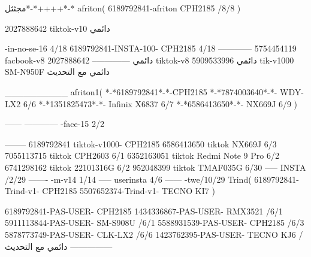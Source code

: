 مجثثل*-*++++*-*
afriton(
6189792841-afriton CPH2185  /8/8
)

2027888642 tiktok-v10
دائمي

-in-no-se-16 4/18
6189792841-INSTA-100- CPH2185 4/18
------------
5754454119 facbook-v8
دائمي
--------------
2027888642 tiktok-v8
دائمي
5909533996 tik-v1000  SM-N950F
دائمي مع التحديث

__________
afriton1(
*-*6189792841*-*-CPH2185
*-*7874003640*-*- WDY-LX2  6/6
*-*1351825473*-*- Infinix X6837  6/7
*-*6586413650*-*- NX669J  6/9
)


------
------------
-face-15 2/2

--------
6189792841 tiktok-v1000- CPH2185 
6586413650 tiktok NX669J  6/3
7055113715 tiktok  CPH2603   6/1
6352163051 tiktok  Redmi Note 9 Pro   6/2
6741298162 tiktok 22101316G  6/2
952048399 tiktok TMAF035G  6/30
-----
 INSTA /2/29
-------
-m-v14 1/14
-----
userinsta 4/6
------
-twe/10/29
Trind(
6189792841-Trind-v1- CPH2185 
5507652374-Trind-v1- TECNO KI7 \6\7
)


6189792841-PAS-USER- CPH2185 
1434336867-PAS-USER-  RMX3521  /6/1
5911113844-PAS-USER-  SM-S908U  /6/1
5588931539-PAS-USER- CPH2185  /6/3
5878773749-PAS-USER- CLK-LX2  /6/6
1423762395-PAS-USER- TECNO KJ6  /دائمي مع التحديث
    ---------------
